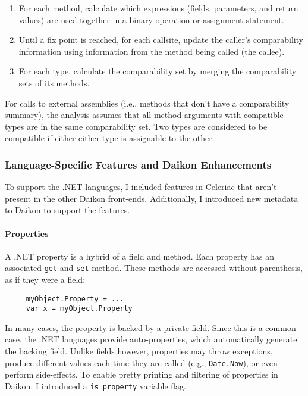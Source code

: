 \begin{enumerate}
\item For each method, calculate which expressions (fields,
  parameters, and return values) are used together in a binary
  operation or assignment statement.
\item Until a fix point is reached, for each callsite, update the
  caller's comparability information using information from the method
  being called (the callee).
\item For each type, calculate the comparability set by merging the
  comparability sets of its methods.
\end{enumerate}

For calls to external assemblies (i.e., methods that don't have a
comparability summary), the analysis assumes that all method arguments
with compatible types are in the same comparability set.
%
Two types are considered to be compatible if either either type is
assignable to the other.

\subsubsection{Language-Specific Features and Daikon Enhancements}

To support the .NET languages, I included features in Celeriac that
aren't present in the other Daikon front-ends. Additionally, I
introduced new metadata to Daikon to support the features.

 \paragraph{Properties}

 A .NET property is a hybrid of a field and method. Each property has an
 associated \verb|get| and \verb|set| method. These methods are
 accessed without parenthesis, as if they were a field:

 \begin{verbatim}
     myObject.Property = ...
     var x = myObject.Property
 \end{verbatim}

 In many cases, the property is backed by a private field. Since this
 is a common case, the .NET languages provide auto-properties, which
 automatically generate the backing field. Unlike fields however,
 properties may throw exceptions, produce different values each time
 they are called (e.g., \verb|Date.Now|), or even perform
 side-effects.
 To enable pretty printing and filtering of properties in Daikon, I
 introduced a \verb|is_property| variable flag.

